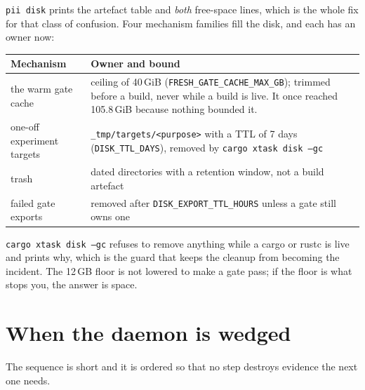 \texttt{pii disk} prints the artefact table and \emph{both} free-space lines, which is the
whole fix for that class of confusion. Four mechanism families fill the disk, and each has
an owner now:

\begin{center}
\begin{tabular}{@{}p{}p{}@{}}
	\toprule
	\textbf{Mechanism} & \textbf{Owner and bound} \\
	\midrule
	the warm gate cache & ceiling of 40\,GiB
	(\texttt{FRESH\_GATE\_CACHE\_MAX\_GB}); trimmed before a build, never while a build is
	live. It once reached 105.8\,GiB because nothing bounded it. \\
        one-off experiment targets & \texttt{\_tmp/targets/\textless{}purpose\textgreater{}}
with a TTL of 7 days
	(\texttt{DISK\_TTL\_DAYS}), removed by \texttt{cargo xtask disk --gc} \\
	trash & dated directories with a retention window, not a build artefact \\
	failed gate exports & removed after \texttt{DISK\_EXPORT\_TTL\_HOURS} unless a gate
	still owns one \\
	\bottomrule
\end{tabular}
\end{center}

\texttt{cargo xtask disk --gc} refuses to remove anything while a cargo or rustc is live
and prints why, which is the guard that keeps the cleanup from becoming the incident. The
12\,GB floor is not lowered to make a gate pass; if the floor is what stops you, the answer
is space.

\section{When the daemon is wedged}

The sequence is short and it is ordered so that no step destroys evidence the next one
needs.

